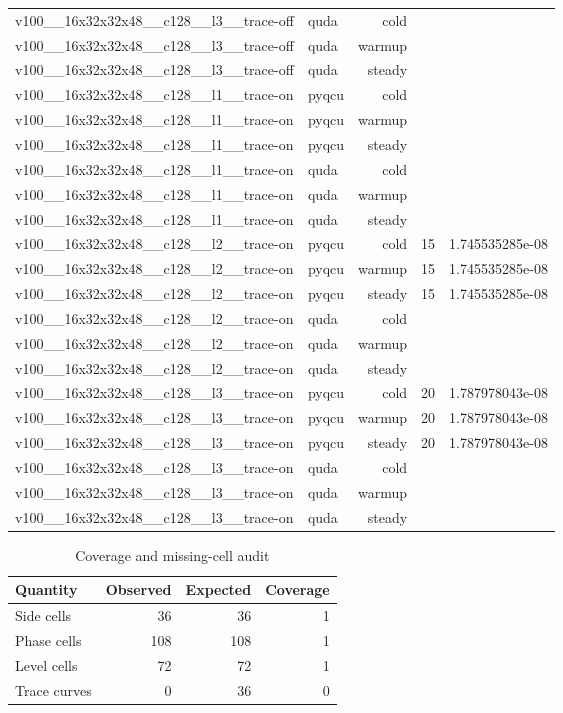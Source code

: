 \begin{table}[htbp]
\begin{tabular}{@{}llrrr@{}}
v100\_\_16x32x32x48\_\_c128\_\_l3\_\_trace-off & quda & cold &  &  \\
v100\_\_16x32x32x48\_\_c128\_\_l3\_\_trace-off & quda & warmup &  &  \\
v100\_\_16x32x32x48\_\_c128\_\_l3\_\_trace-off & quda & steady &  &  \\
v100\_\_16x32x32x48\_\_c128\_\_l1\_\_trace-on & pyqcu & cold &  &  \\
v100\_\_16x32x32x48\_\_c128\_\_l1\_\_trace-on & pyqcu & warmup &  &  \\
v100\_\_16x32x32x48\_\_c128\_\_l1\_\_trace-on & pyqcu & steady &  &  \\
v100\_\_16x32x32x48\_\_c128\_\_l1\_\_trace-on & quda & cold &  &  \\
v100\_\_16x32x32x48\_\_c128\_\_l1\_\_trace-on & quda & warmup &  &  \\
v100\_\_16x32x32x48\_\_c128\_\_l1\_\_trace-on & quda & steady &  &  \\
v100\_\_16x32x32x48\_\_c128\_\_l2\_\_trace-on & pyqcu & cold & 15 & 1.745535285e-08 \\
v100\_\_16x32x32x48\_\_c128\_\_l2\_\_trace-on & pyqcu & warmup & 15 & 1.745535285e-08 \\
v100\_\_16x32x32x48\_\_c128\_\_l2\_\_trace-on & pyqcu & steady & 15 & 1.745535285e-08 \\
v100\_\_16x32x32x48\_\_c128\_\_l2\_\_trace-on & quda & cold &  &  \\
v100\_\_16x32x32x48\_\_c128\_\_l2\_\_trace-on & quda & warmup &  &  \\
v100\_\_16x32x32x48\_\_c128\_\_l2\_\_trace-on & quda & steady &  &  \\
v100\_\_16x32x32x48\_\_c128\_\_l3\_\_trace-on & pyqcu & cold & 20 & 1.787978043e-08 \\
v100\_\_16x32x32x48\_\_c128\_\_l3\_\_trace-on & pyqcu & warmup & 20 & 1.787978043e-08 \\
v100\_\_16x32x32x48\_\_c128\_\_l3\_\_trace-on & pyqcu & steady & 20 & 1.787978043e-08 \\
v100\_\_16x32x32x48\_\_c128\_\_l3\_\_trace-on & quda & cold &  &  \\
v100\_\_16x32x32x48\_\_c128\_\_l3\_\_trace-on & quda & warmup &  &  \\
v100\_\_16x32x32x48\_\_c128\_\_l3\_\_trace-on & quda & steady &  &  \\
\bottomrule
\end{tabular}
\end{table}

\begin{table}[htbp]
\centering
\caption{Coverage and missing-cell audit}
\small
\begin{tabular}{@{}lrrr@{}}
\toprule
Quantity & Observed & Expected & Coverage \\
\midrule
Side cells & 36 & 36 & 1 \\
Phase cells & 108 & 108 & 1 \\
Level cells & 72 & 72 & 1 \\
Trace curves & 0 & 36 & 0 \\
\bottomrule
\end{tabular}
\end{table}
